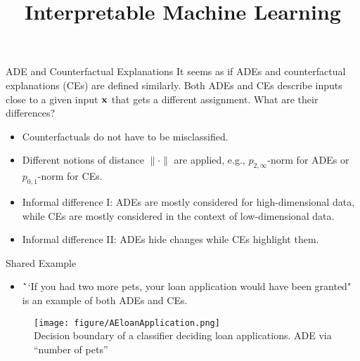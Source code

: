 \documentclass[10pt,compress,t,notes=noshow, xcolor=table]{beamer}
\title{Interpretable Machine Learning}
\date{}
\begin{document}
\newcommand{\vertiii}[1]{{\left\vert\kern-0.25ex\left\vert\kern-0.25ex\left\vert #1 
    \right\vert\kern-0.25ex\right\vert\kern-0.25ex\right\vert}}


 \newcommand{\titlefigure}{figure/AEloanApplication.png} 
\newcommand{\learninggoals}{
\item Compare adversarial examples to counterfactual explanations
\item See an example where both coincident}



\begin{vbframe}{ADE and Counterfactual Explanations}
It seems as if ADEs and counterfactual explanations (CEs) are defined similarly. Both ADEs and CEs describe inputs close to a given input $\mathbf{x}$ that gets a different assignment. What are their differences?
\begin{itemize}
    \item Counterfactuals do not have to be misclassified.
    \item Different notions of distance $\|\cdot\|$ are applied, e.g., $p_{2,\infty}$-norm for ADEs or $p_{0,1}$-norm for CEs.
    \item Informal difference I: ADEs are mostly considered for high-dimensional data, while CEs are mostly considered in the context of low-dimensional data.
    \item Informal difference II: ADEs hide changes while CEs highlight them.
\end{itemize}
\end{vbframe}

\begin{vbframe}{Shared Example }
\begin{itemize}
\item \textbf``If you had two more pets, your loan application would have been granted" is an example of both ADEs and CEs.
\end{itemize}
\begin{figure}[h]
\centering
\texttt{[image: figure/AEloanApplication.png]}\\
   \centering
  {Decision boundary of a classifier deciding loan applications. ADE via ``number of pets''}
  \label{fig:mnist}
\end{figure} 
\end{vbframe}

\endlecture
\end{document}
